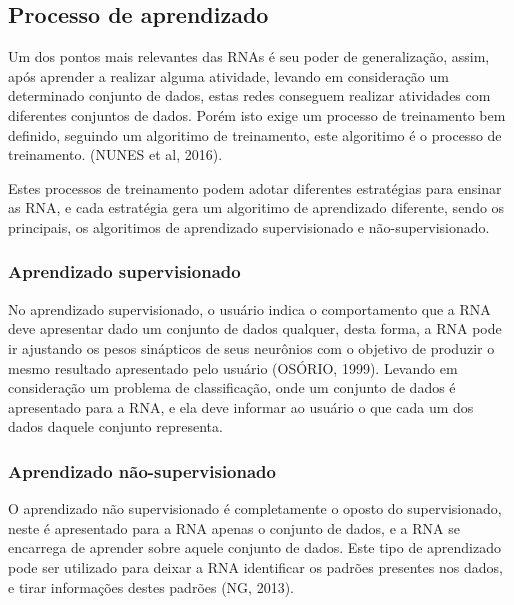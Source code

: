 \subsection{Processo de aprendizado}

Um dos pontos mais relevantes das RNAs é seu poder de generalização, assim, após aprender a realizar alguma atividade, levando em consideração um determinado conjunto de dados, estas redes conseguem realizar atividades com diferentes conjuntos de dados. Porém isto exige um processo de treinamento bem definido, seguindo um algoritimo de treinamento, este algoritimo é o processo de treinamento. (NUNES et al, 2016).

Estes processos de treinamento podem adotar diferentes estratégias para ensinar as RNA, e cada estratégia gera um algoritimo de aprendizado diferente, sendo os principais, os algoritimos de aprendizado supervisionado e não-supervisionado.

\subsubsection{Aprendizado supervisionado}

No aprendizado supervisionado, o usuário indica o comportamento que a RNA deve apresentar dado um conjunto de dados qualquer, desta forma, a RNA pode ir ajustando os pesos sinápticos de seus neurônios com o objetivo de produzir o mesmo resultado apresentado pelo usuário (OSÓRIO, 1999). Levando em consideração um problema de classificação, onde um conjunto de dados é apresentado para a RNA, e ela deve informar ao usuário o que cada um dos dados daquele conjunto representa.

\subsubsection{Aprendizado não-supervisionado}

O aprendizado não supervisionado é completamente o oposto do supervisionado, neste é apresentado para a RNA apenas o conjunto de dados, e a RNA se encarrega de aprender sobre aquele conjunto de dados. Este tipo de aprendizado pode ser utilizado para deixar a RNA identificar os padrões presentes nos dados, e tirar informações destes padrões (NG, 2013). 

